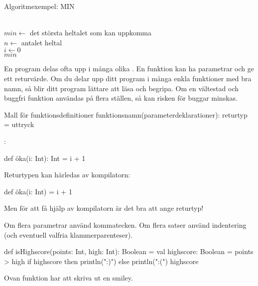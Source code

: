 \begin{Slide}{Algoritmexempel: MIN}
\begin{algorithm}[H]

 ~\\
 $min \leftarrow$ det största heltalet som kan uppkomma  \\
 $n \leftarrow $ antalet heltal \\
 $i \leftarrow 0$ \\
 $min$
\end{algorithm}
\end{Slide}



\ifkompendium
\noindent En program delas ofta upp i många olika . En funktion kan ha parametrar och ge ett returvärde. Om du delar upp ditt program i många enkla funktioner med bra namn, så blir ditt program lättare att läsa och begripa. Om en vältestad och buggfri funktion användas på flera ställen, så kan risken för buggar minskas.
\fi 

\begin{Slide}{Mall för funktionsdefinitioner}
 funktionsnamn(parameterdeklarationer): returtyp = uttryck

\pause\vspace{0.3em}\SlideFontSmall
{}:

\begin{Code}[basicstyle=\ttfamily\fontsize{9}{11}\selectfont]
def öka(i: Int): Int = i + 1
\end{Code}
\pause Returtypen kan härledas av kompilatorn:
\begin{Code}[basicstyle=\ttfamily\fontsize{9}{11}\selectfont]
def öka(i: Int) = i + 1
\end{Code}
Men för att få hjälp av kompilatorn är det bra att ange returtyp!

\pause 

Om flera parametrar använd kommatecken. Om flera satser använd indentering (och eventuell valfria klammerparenteser).
\begin{Code}[basicstyle=\ttfamily\fontsize{8}{10}\selectfont]
def isHighscore(points: Int, high: Int): Boolean = {
  val highscore: Boolean = points > high
  if highscore then println(":)") else println(":(")
  highscore
}
\end{Code}
\pause Ovan funktion har  att skriva ut en smiley.
\end{Slide}

